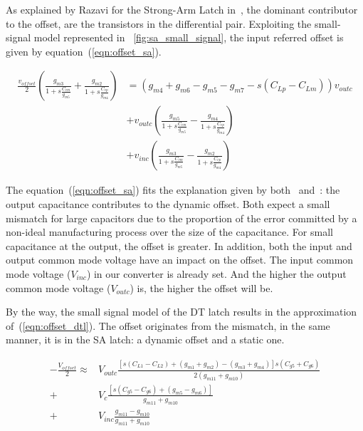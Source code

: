 As explained by Razavi for the Strong-Arm Latch in~\cite{Razavi2015}, the dominant contributor to the offset, are the transistors in the differential pair. Exploiting the small-signal model represented in \figurename~\ref{fig:sa_small_signal}, the input referred offset is given by equation~(\ref{eqn:offset_sa}).

\begin{align}
    \label{eqn:offset_sa}
    \frac{v_{offset}}{2} \left( \frac{g_{m3}}{1+s\frac{C_{cm}}{g_{m5}}} + \frac{g_{m2}}{1+s\frac{C_{cp}}{g_{m4}}} \right) &= \left( g_{m4}+g_{m6}-g_{m5}-g_{m7}-s\left(C_{Lp}-C_{Lm}\right) \right) v_{outc} \\
    &+ v_{outc} \left( \frac{g_{m5}}{1+s\frac{C_{cm}}{g_{m5}}} - \frac{g_{m4}}{1+s\frac{C_{cp}}{g_{m4}}} \right) \nonumber \\
    &+ v_{inc} \left( \frac{g_{m3}}{1+s\frac{C_{cm}}{g_{m5}}} - \frac{g_{m2}}{1+s\frac{C_{cp}}{g_{m4}}} \right) \nonumber
\end{align}

The equation~(\ref{eqn:offset_sa}) fits the explanation given by both~\cite{Razavi2015} and~\cite{Abidi2014}: the output capacitance contributes to the dynamic offset. Both expect a small mismatch for large capacitors due to the proportion of the error committed by a non-ideal manufacturing process over the size of the capacitance. For small capacitance at the output, the offset is greater. In addition, both the input and output common mode voltage have an impact on the offset. The input common mode voltage (\(V_{inc}\)) in our converter is already set. And the higher the output common mode voltage (\(V_{outc}\)) is, the higher the offset will be.

By the way, the small signal model of the DT latch results in the approximation of~(\ref{eqn:offset_dtl}). The offset originates from the mismatch, in the same manner, it is in the SA latch: a dynamic offset and a static one.

\begin{align}
\label{eqn:offset_dtl}
-\frac{V_{offset}}{2} \approx & V_{outc}\frac{\left[s \left(C_{L1} - C_{L2}\right) + \left(g_{m1}+g_{m2}\right) -\left(g_{m3}+g_{m4}\right)\right] s \left(C_{g5} + C_{g6}\right)}{2(g_{m11}+g_{m10})}\\
+ & V_c \frac{\left[s \left(C_{g5}-C_{g6}\right) + \left(g_{m5}-g_{m6}\right)\right]}{g_{m11}+g_{m10}}  \nonumber  \\
+ & V_{inc}\frac{g_{m11}-g_{m10}}{g_{m11}+g_{m10}} \nonumber 
\end{align}

